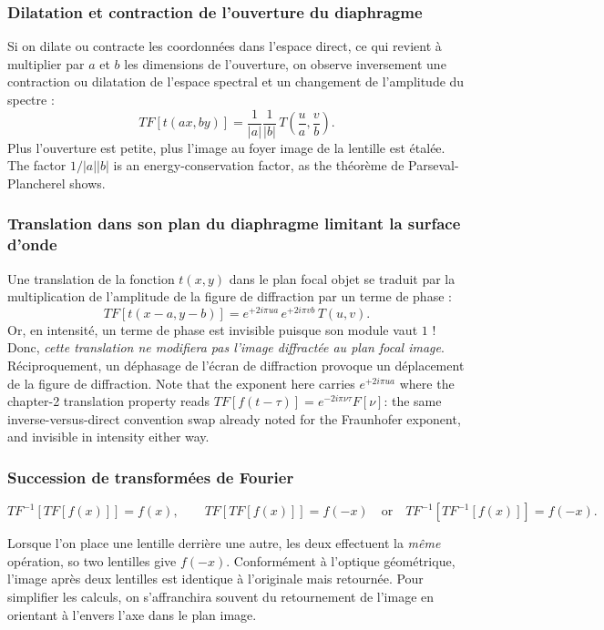 \subsubsection{Dilatation et contraction de l'ouverture du diaphragme}
Si on dilate ou contracte les coordonnées dans l'espace direct, ce qui revient à
multiplier par $a$ et $b$ les dimensions de l'ouverture, on observe inversement
une contraction ou dilatation de l'espace spectral et un changement de
l'amplitude du spectre :
\begin{equation*}
  TF\!\left[t(ax,by)\right] = \frac{1}{|a|}\frac{1}{|b|}\,
    T\!\left(\frac{u}{a}, \frac{v}{b}\right).
\end{equation*}
Plus l'ouverture est petite, plus l'image au foyer image de la lentille est
étalée. The factor $1/|a||b|$ is an energy-conservation factor, as the théorème
de Parseval-Plancherel shows.

\subsubsection{Translation dans son plan du diaphragme limitant la surface d'onde}
Une translation de la fonction $t(x,y)$ dans le plan focal objet se traduit par
la multiplication de l'amplitude de la figure de diffraction par un terme de
phase :
\begin{equation*}
  TF\!\left[t(x-a, y-b)\right] = e^{+2i\pi u a}\, e^{+2i\pi v b}\, T(u,v).
\end{equation*}
Or, en intensité, un terme de phase est invisible puisque son module vaut $1$ !
Donc, \emph{cette translation ne modifiera pas l'image diffractée au plan focal
image}. Réciproquement, un déphasage de l'écran de diffraction provoque un
déplacement de la figure de diffraction. Note that the exponent here carries
$e^{+2i\pi ua}$ where the chapter-2 translation property reads
$TF[f(t-\tau)] = e^{-2i\pi\nu\tau}F[\nu]$: the same inverse-versus-direct
convention swap already noted for the Fraunhofer exponent, and invisible in
intensity either way.

\subsubsection{Succession de transformées de Fourier}
\begin{prop}
  \[
    TF^{-1}\!\left[TF[f(x)]\right] = f(x),
    \qquad
    TF\!\left[TF[f(x)]\right] = f(-x)
    \quad\text{or}\quad
    TF^{-1}\!\left[TF^{-1}[f(x)]\right] = f(-x).
  \]
\end{prop}
Lorsque l'on place une lentille derrière une autre, les deux effectuent la
\emph{même} opération, so two lentilles give $f(-x)$. Conformément à l'optique
géométrique, l'image après deux lentilles est identique à l'originale mais
retournée. Pour simplifier les calculs, on s'affranchira souvent du retournement
de l'image en orientant à l'envers l'axe dans le plan image.

